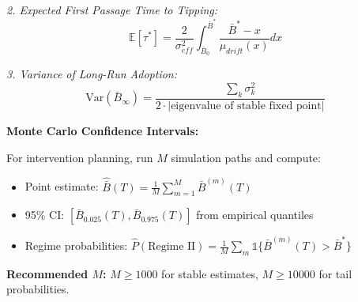 \begin{tcolorbox}[colback=purple!5!white, colframe=purple!75!black,
    title=\textbf{Method UNTCM-M3: Stochastic Extension (Full SDE)}]
\textit{2. Expected First Passage Time to Tipping:}
\begin{equation}
\mathbb{E}[\tau^*] = \frac{2}{\sigma_{eff}^2} \int_{\bar{B}_0}^{\bar{B}^*} \frac{\bar{B}^* - x}{\mu_{drift}(x)} dx
\end{equation}

\textit{3. Variance of Long-Run Adoption:}
\begin{equation}
\text{Var}(\bar{B}_\infty) = \frac{\sum_k \sigma_k^2}{2 \cdot |\text{eigenvalue of stable fixed point}|}
\end{equation}

\textbf{Monte Carlo Confidence Intervals:}

For intervention planning, run $M$ simulation paths and compute:
\begin{itemize}[nosep]
\item Point estimate: $\hat{\bar{B}}(T) = \frac{1}{M} \sum_{m=1}^{M} \bar{B}^{(m)}(T)$
\item 95\% CI: $[\bar{B}_{0.025}(T), \bar{B}_{0.975}(T)]$ from empirical quantiles
\item Regime probabilities: $\hat{P}(\text{Regime II}) = \frac{1}{M} \sum_m \mathbb{1}\{\bar{B}^{(m)}(T) > \bar{B}^*\}$
\end{itemize}

\textbf{Recommended $M$:} $M \geq 1000$ for stable estimates, $M \geq 10000$ for tail probabilities.

\end{tcolorbox}

